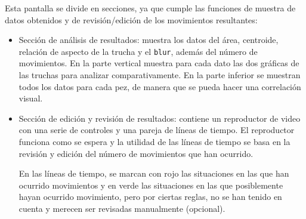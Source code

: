 Esta pantalla se divide en secciones, ya que cumple las funciones de muestra de datos obtenidos y de revisión/edición de los movimientos resultantes:
\begin{itemize}
    \item Sección de análisis de resultados: muestra los datos del área, centroide, relación de aspecto de la trucha y el \texttt{blur}, además del número de movimientos. En la parte vertical muestra para cada dato las dos gráficas 
    de las truchas para analizar comparativamente. En la parte inferior se muestran todos los datos para cada pez, de manera que se pueda hacer una correlación visual.
    \item Sección de edición y revisión de resultados: contiene un reproductor de video con una serie de controles y una pareja de líneas de tiempo. El reproductor funciona como se espera y la utilidad de las líneas de tiempo se 
    basa en la revisión y edición del número de movimientos que han ocurrido.

    En las líneas de tiempo, se marcan con rojo las situaciones en las que han ocurrido movimientos y en verde las situaciones en las que posiblemente hayan ocurrido movimiento, pero por ciertas reglas, no se han tenido en cuenta 
    y merecen ser revisadas manualmente (opcional).


\end{itemize}
